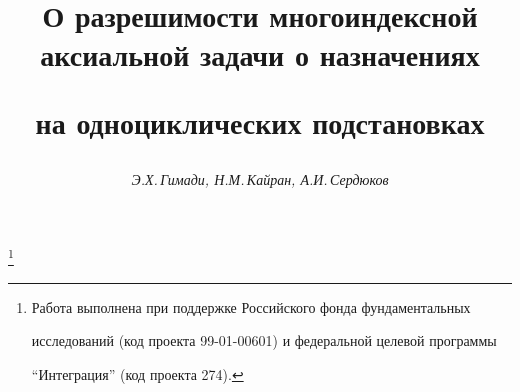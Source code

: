 




 




\newcommand{\Mod}{\operatorname{mod}}


\newcommand{\tts}[1]{}







\setcounter{page}{21}















\author{\it Э.Х.\,Гимади, Н.М.\,Кайран, А.И.\,Сердюков}




\title{О разрешимости многоиндексной аксиальной задачи о назначениях


на одноциклических подстановках}


\thanks{Работа выполнена при поддержке Российского фонда фундаментальных


исследований (код проекта 99-01-00601) и федеральной целевой программы


``Интеграция'' (код проекта 274).}





\date{}




\pagestyle{plain} %





